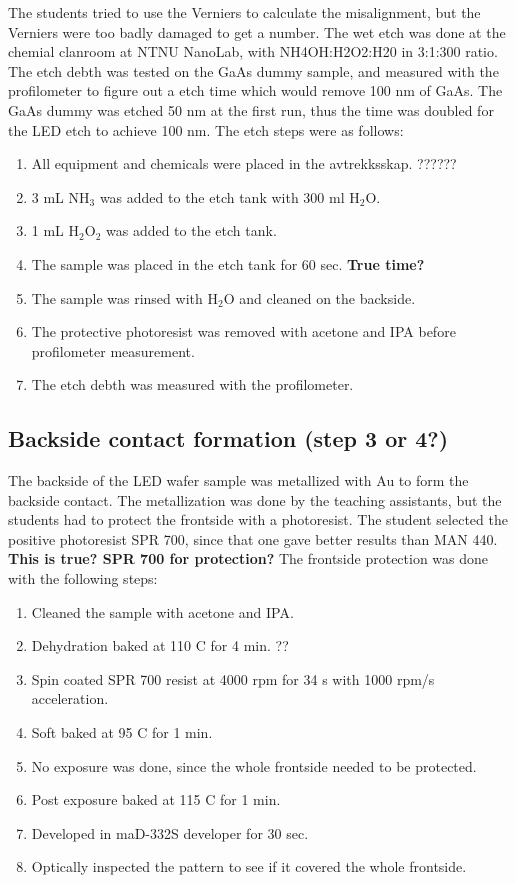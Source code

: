 The students tried to use the Verniers to calculate the misalignment, but the Verniers were too badly damaged to get a number.
The wet etch was done at the chemial clanroom at NTNU NanoLab, with NH4OH:H2O2:H20 in 3:1:300 ratio.
The etch debth was tested on the GaAs dummy sample, and measured with the profilometer to figure out a etch time which would remove 100 nm of GaAs.
The GaAs dummy was etched 50 nm at the first run, thus the time was doubled for the LED etch to achieve 100 nm.
The etch steps were as follows:

\begin{enumerate}
    \item All equipment and chemicals were placed in the avtrekksskap. ??????
    \item 3 mL NH$_3$ was added to the etch tank with 300 ml H$_2$O.
    \item 1 mL H$_2$O$_2$ was added to the etch tank.
    \item The sample was placed in the etch tank for 60 sec. \textbf{True time?}
    \item The sample was rinsed with H$_2$O and cleaned on the backside.
    \item The protective photoresist was removed with acetone and IPA before profilometer measurement.
    \item The etch debth was measured with the profilometer.
\end{enumerate}



\subsection{Backside contact formation (step 3 or 4?)}
\label{methods:backside_metallization}
The backside of the LED wafer sample was metallized with Au to form the backside contact.
The metallization was done by the teaching assistants, but the students had to protect the frontside with a photoresist.
The student selected the positive photoresist SPR 700, since that one gave better results than MAN 440.
\textbf{This is true? SPR 700 for protection?}
The frontside protection was done with the following steps:
\begin{enumerate}
    \item Cleaned the sample with acetone and IPA.
    \item Dehydration baked at 110 \textdegree C for 4 min. ??
    \item Spin coated SPR 700 resist at 4000 rpm for 34 s with 1000 rpm/s acceleration.
    \item Soft baked at 95 \textdegree C for 1 min.
    \item No exposure was done, since the whole frontside needed to be protected.
    \item Post exposure baked at 115 \textdegree C for 1 min.
    \item Developed in maD-332S developer for 30 sec.
    \item Optically inspected the pattern to see if it covered the whole frontside.
\end{enumerate}



